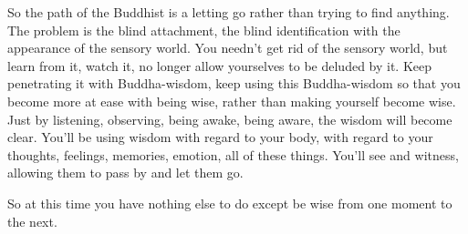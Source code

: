 So the path of the Buddhist is a letting go rather than trying to find anything. The problem is the blind attachment, the blind identification with the appearance of the sensory world. You needn't get rid of the sensory world, but learn from it, watch it, no longer allow yourselves to be deluded by it. Keep penetrating it with Buddha-wisdom, keep using this Buddha-wisdom so that you become more at ease with being wise, rather than making yourself become wise. Just by listening, observing, being awake, being aware, the wisdom will become clear. You'll be using wisdom with regard to your body, with regard to your thoughts, feelings, memories, emotion, all of these things. You'll see and witness, allowing them to pass by and let them go.

So at this time you have nothing else to do except be wise from one moment to the next.
